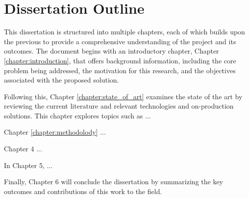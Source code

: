 \section{Dissertation Outline}

This dissertation is structured into multiple chapters, each of which builds upon the previous to provide a comprehensive understanding of the project and its outcomes. The document begins with an introductory chapter, Chapter \ref{chapter:introduction}, that offers background information, including the core problem being addressed, the motivation for this research, and the objectives associated with the proposed solution.

Following this, Chapter \ref{chapter:state_of_art} examines the state of the art by reviewing the current literature and relevant technologies and on-production solutions. This chapter explores topics such as ... %

Chapter \ref{chapter:methodolody} ... %

Chapter 4 ... %

In Chapter 5, ... %

Finally, Chapter 6 will conclude the dissertation by summarizing the key outcomes and contributions of this work to the field. %


